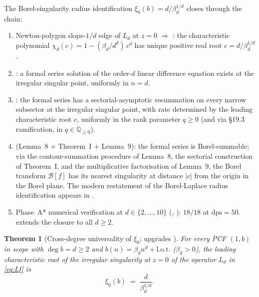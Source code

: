\documentclass[11pt,reqno]{amsart}
\theoremstyle{plain}
\newtheorem{theorem}{Theorem}[section]
\theoremstyle{definition}
\theoremstyle{remark}
\newcommand{\dps}{\mathrm{dps}}
\newcommand{\Borel}{\mathcal{B}}
\begin{document}
The Borel-singularity radius identification
$\xi_0(b) = d / \beta_d^{1/d}$ closes through the chain:

\begin{enumerate}[label=(\arabic*),leftmargin=2.2em]
\item Newton-polygon slope-$1/d$ edge of $L_d$ at $z=0$
$\Longrightarrow$ : the
characteristic polynomial $\chi_d(c) = 1 - (\beta_d/d^d)\,c^d$
has unique positive real root $c = d / \beta_d^{1/d}$.

\item \cite[\S2~Thm.~I]{birkhoff1930formal}: a formal
series solution of the order-$d$ linear difference equation
exists at the irregular singular point, uniformly in $n = d$.

\item \cite[\S19~Thm.~19.1, eq.~(19.3)]{wasow1965asymptotic}:
the formal series has a sectorial-asymptotic resummation
on every narrow subsector at the irregular singular point,
with rate determined by the leading characteristic root $c$,
uniformly in the rank parameter $q \ge 0$ (and via
\S19.3 ramification, in $q \in \mathbb{Q}_{\ge 0}$).

\item \cite[\S\S4--6]{birkhoff_trjitzinsky_1933}
(Lemma~8 + Theorem~I + Lemma~9): the formal series is
Borel-summable; via the contour-summation procedure of
Lemma~8, the sectorial construction of Theorem~I, and the
multiplicative factorisation of Lemma~9, the Borel transform
$\Borel[f]$ has its nearest singularity at distance $|c|$
from the origin in the Borel plane. The modern restatement
of the Borel-Laplace radius identification appears in
\cite[ch.~5, \S5.0a]{costin2008asymptotics}.

\item Phase~A* numerical verification at
$d \in \{2,\ldots,10\}$
(\cite[Phase~A*]{siarc_q20a_phase_c_resume},
): $18/18$ at $\dps = 50$.
 extends the closure to all
$d \ge 2$.
\end{enumerate}

\begin{theorem}[Cross-degree universality of $\xi_0$;
upgrades {\cite[Conj.~3.3.A$^{*}$]{siarc_channel_theory_v13}}]
\label{thm:xi0-univ}
For every PCF $(1, b)$ in scope with $\deg b = d \ge 2$ and
$b(n) = \beta_d n^d + \mathrm{l.o.t.}$ ($\beta_d > 0$), the
leading characteristic root of the irregular singularity at
$z = 0$ of the operator $L_d$ in \eqref{eq:Lf} is
\[
  \xi_0(b) \;=\; \frac{d}{\beta_d^{1/d}}.
\]
\end{theorem}
\end{document}
